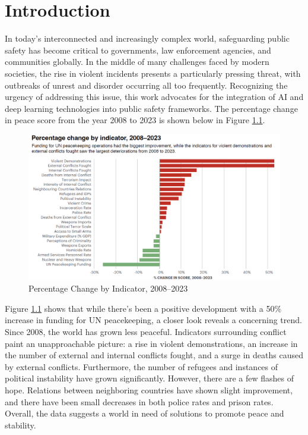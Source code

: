 \setcounter{equation}{0}
\chapter{Introduction}


\setlength{\parskip}{2ex}

\noindent In today's interconnected and increasingly complex world, safeguarding public safety has become critical to governments, law enforcement agencies, and communities globally. In the middle of many challenges faced by modern societies, the rise in violent incidents presents a particularly pressing threat, with outbreaks of unrest and disorder occurring all too frequently. Recognizing the urgency of addressing this issue, this work advocates for the integration of AI and deep learning technologies into public safety frameworks\cite{ai_saftey}. The percentage change in peace score from the year 2008 to 2023 is shown below in Figure \ref{fig:gpi1}.

\begin{figure}[htbp!]
    \centering
    \includegraphics[width=0.875\linewidth]{Images/gpi 1.png}
    \caption{Percentage Change by Indicator, 2008–2023}
    \label{fig:gpi1}
\end{figure}

\noindent Figure \ref{fig:gpi1} shows that while there's been a positive development with a 50\% increase in funding for UN peacekeeping, a closer look reveals a concerning trend. Since 2008, the world has grown less peaceful. Indicators surrounding conflict paint an unapproachable picture: a rise in violent demonstrations, an increase in the number of external and internal conflicts fought, and a surge in deaths caused by external conflicts. Furthermore, the number of refugees and instances of political instability have grown significantly. However, there are a few flashes of hope. Relations between neighboring countries have shown slight improvement, and there have been small decreases in both police rates and prison rates. Overall, the data suggests a world in need of solutions to promote peace and stability.

